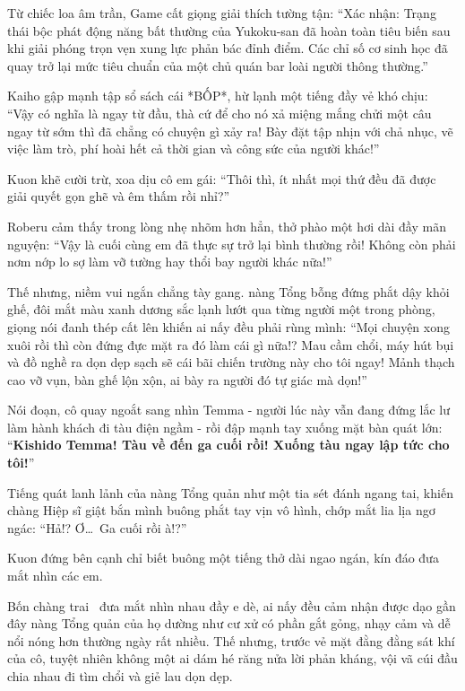 \documentclass[../main.tex]{subfiles}
\begin{document}
Từ chiếc loa âm trần, Game cất giọng giải thích tường tận: ``Xác nhận: Trạng thái bộc phát động năng bất thường của Yukoku-san đã hoàn toàn tiêu biến sau khi giải phóng trọn vẹn xung lực phản bác đỉnh điểm. Các chỉ số cơ sinh học đã quay trở lại mức tiêu chuẩn của một chủ quán bar loài người thông thường.''

Kaiho gập mạnh tập sổ sách cái *BỐP*, hừ lạnh một tiếng đầy vẻ khó chịu: ``Vậy có nghĩa là ngay từ đầu, thà cứ để cho nó xả miệng mắng chửi một câu ngay từ sớm thì đã chẳng có chuyện gì xảy ra! Bày đặt tập nhịn với chả nhục, vẽ việc làm trò, phí hoài hết cả thời gian và công sức của người khác!''

Kuon khẽ cười trừ, xoa dịu cô em gái: ``Thôi thì, ít nhất mọi thứ đều đã được giải quyết gọn ghẽ và êm thấm rồi nhỉ?''

Roberu cảm thấy trong lòng nhẹ nhõm hơn hẳn, thở phào một hơi dài đầy mãn nguyện: ``Vậy là cuối cùng em đã thực sự trở lại bình thường rồi! Không còn phải nơm nớp lo sợ làm vỡ tường hay thổi bay người khác nữa!''

Thế nhưng, niềm vui ngắn chẳng tày gang. nàng Tổng bỗng đứng phắt dậy khỏi ghế, đôi mắt màu xanh dương sắc lạnh lướt qua từng người một trong phòng, giọng nói đanh thép cất lên khiến ai nấy đều phải rùng mình: ``Mọi chuyện xong xuôi rồi thì còn đứng đực mặt ra đó làm cái gì nữa!? Mau cầm chổi, máy hút bụi và đồ nghề ra dọn dẹp sạch sẽ cái bãi chiến trường này cho tôi ngay! Mảnh thạch cao vỡ vụn, bàn ghế lộn xộn, ai bày ra người đó tự giác mà dọn!''

Nói đoạn, cô quay ngoắt sang nhìn Temma - người lúc này vẫn đang đứng lắc lư làm hành khách đi tàu điện ngầm - rồi đập mạnh tay xuống mặt bàn quát lớn: ``\textbf{Kishido Temma! Tàu về đến ga cuối rồi! Xuống tàu ngay lập tức cho tôi!}''

Tiếng quát lanh lảnh của nàng Tổng quản như một tia sét đánh ngang tai, khiến chàng Hiệp sĩ giật bắn mình buông phắt tay vịn vô hình, chớp mắt lia lịa ngơ ngác: ``Hả!? Ơ\dots\ Ga cuối rồi à!?''

Kuon đứng bên cạnh chỉ biết buông một tiếng thở dài ngao ngán, kín đáo đưa mắt nhìn các em.

Bốn chàng trai \hls\ đưa mắt nhìn nhau đầy e dè, ai nấy đều cảm nhận được dạo gần đây nàng Tổng quản của họ dường như cư xử có phần gắt gỏng, nhạy cảm và dễ nổi nóng hơn thường ngày rất nhiều. Thế nhưng, trước vẻ mặt đằng đằng sát khí của cô, tuyệt nhiên không một ai dám hé răng nửa lời phản kháng, vội vã cúi đầu chia nhau đi tìm chổi và giẻ lau dọn dẹp.
\end{document}
